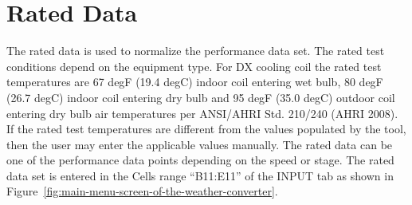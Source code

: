 \section{Rated Data}\label{rated-data}

The rated data is used to normalize the performance data set. The rated test conditions depend on the equipment type. For DX cooling coil the rated test temperatures are 67 degF (19.4 degC) indoor coil entering wet bulb, 80 degF (26.7 degC) indoor coil entering dry bulb and 95 degF (35.0 degC) outdoor coil entering dry bulb air temperatures per ANSI/AHRI Std. 210/240 (AHRI 2008). If the rated test temperatures are different from the values populated by the tool, then the user may enter the applicable values manually. The rated data can be one of the performance data points depending on the speed or stage. The rated data set is entered in the Cells range ``B11:E11'' of the INPUT tab as shown in Figure~\ref{fig:main-menu-screen-of-the-weather-converter}.
